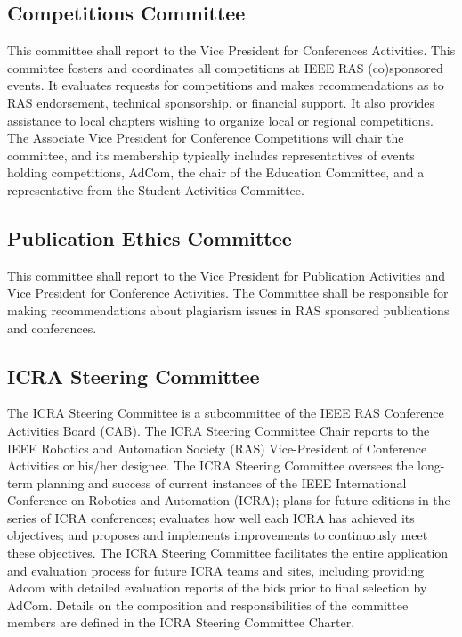 \documentclass[10pt]{article}
\begin{document}
\subsection{Competitions Committee}
This committee shall report to the Vice President for Conferences Activities. This committee fosters and coordinates all competitions at IEEE RAS (co)sponsored events.  It evaluates requests for competitions and makes recommendations as to RAS endorsement, technical sponsorship, or financial support.  It also provides assistance to local chapters wishing to organize local or regional competitions. The Associate Vice President for Conference Competitions will chair the committee, and its membership typically includes representatives of events holding competitions, AdCom, the chair of the Education Committee, and a representative from the Student Activities Committee.



\subsection{Publication Ethics Committee}

This committee shall report to the Vice President for Publication Activities and Vice President for Conference Activities. The Committee shall be responsible for making recommendations about plagiarism issues in RAS sponsored publications and conferences.


\subsection{ICRA Steering Committee}

The ICRA Steering Committee is a subcommittee of the IEEE RAS Conference Activities Board (CAB). The ICRA Steering Committee Chair reports to the IEEE Robotics and Automation Society (RAS) Vice-President of Conference Activities or his/her designee. The ICRA Steering Committee oversees the long-term planning and success of current instances of the IEEE International Conference on Robotics and Automation (ICRA); plans for future editions in the series of ICRA conferences; evaluates how well each ICRA has achieved its objectives; and proposes and implements improvements to continuously meet these objectives. The ICRA Steering Committee facilitates the entire application and evaluation process for future ICRA teams and sites, including providing Adcom with detailed evaluation reports of the bids prior to final selection by AdCom. Details on the composition and responsibilities of the committee members are defined in the ICRA Steering Committee Charter.
\end{document}
